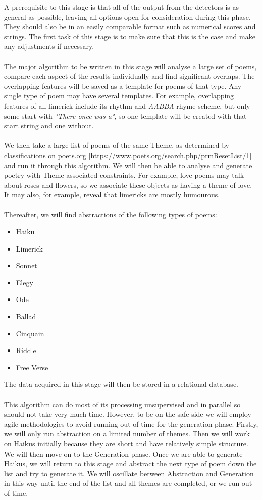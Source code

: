 A prerequisite to this stage is that all of the output from the detectors is as general as possible, leaving all options open for consideration during this phase. They should also be in an easily comparable format such as numerical scores and strings. The first task of this stage is to make sure that this is the case and make any adjustments if necessary.
\\\\
The major algorithm to be written in this stage will analyse a large set of poems, compare each aspect of the results individually and find significant overlaps. The overlapping features will be saved as a template for poems of that type. Any single type of poem may have several templates. For example, overlapping features of all limerick include its rhythm and \textit{AABBA} rhyme scheme, but only some start with \textit{"There once was a"}, so one template will be created with that start string and one without.
\\\\
We then take a large list of poems of the same Theme, as determined by classifications on poets.org [https://www.poets.org/search.php/prmResetList/1] and run it through this algorithm. We will then be able to analyse and generate poetry with Theme-associated constraints. For example, love poems may talk about roses and flowers, so we associate these objects as having a theme of love. It may also, for example, reveal that limericks are mostly humourous.
\\\\
Thereafter, we will find abstractions of the following types of poems:
\begin{itemize}
\setlength{\itemsep}{0pt}
\item{Haiku}
\item{Limerick}
\item{Sonnet}
\item{Elegy}
\item{Ode}
\item{Ballad}
\item{Cinquain}
\item{Riddle}
\item{Free Verse}
\end{itemize}

The data acquired in this stage will then be stored in a relational database.
\\\\
This algorithm can do most of its processing unsupervised and in parallel so should not take very much time. However, to be on the safe side we will employ agile methodologies to avoid running out of time for the generation phase. Firstly, we will only run abstraction on a limited number of themes. Then we will work on Haikus initially because they are short and have relatively simple structure. We will then move on to the Generation phase. Once we are able to generate Haikus, we will return to this stage and abstract the next type of poem down the list and try to generate it. We will oscillate between Abstraction and Generation in this way until the end of the list and all themes are completed, or we run out of time.

